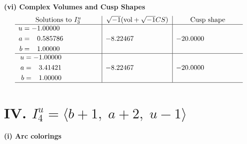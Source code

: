 \documentclass[1p]{elsarticle_modified}
\theoremstyle{definition}
\newcommand{\I}{\sqrt{-1}}
\begin{document}
\newpage\flushleft \textbf{(vi) Complex Volumes and Cusp Shapes}
$$\begin{array}{c|c|c}  
\text{Solutions to }I^u_{3}& \I (\text{vol} + \sqrt{-1}CS) & \text{Cusp shape}\\
 \hline 
\begin{aligned}
u &= -1.00000\phantom{ +0.000000I} \\
a &= \phantom{-}0.585786\phantom{ +0.000000I} \\
b &= \phantom{-}1.00000\phantom{ +0.000000I}\end{aligned}
 & -8.22467\phantom{ +0.000000I} & -20.0000\phantom{ +0.000000I} \\ \hline\begin{aligned}
u &= -1.00000\phantom{ +0.000000I} \\
a &= \phantom{-}3.41421\phantom{ +0.000000I} \\
b &= \phantom{-}1.00000\phantom{ +0.000000I}\end{aligned}
 & -8.22467\phantom{ +0.000000I} & -20.0000\phantom{ +0.000000I}\\
 \hline 
 \end{array}$$\newpage\newpage\renewcommand{\arraystretch}{1}
\centering \section*{IV. $I^u_{4}= \langle b+1,\;a+2,\;u-1 \rangle$}
\flushleft \textbf{(i) Arc colorings}\\
\end{document}
